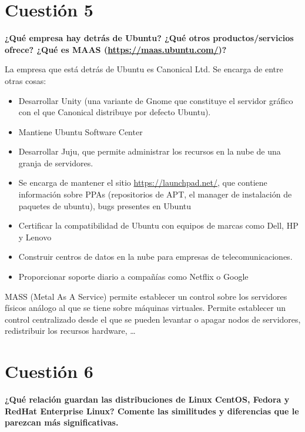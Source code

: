 \documentclass[a4paper,11pt]{article}
\newenvironment{answer}{%
\begin{list}{}{%
\addtolength{\hoffset}{0cm}
}%
\item[]}{\end{list}}
\begin{document}
\section{Cuestión 5}
\textbf{¿Qué empresa hay detrás de Ubuntu? ¿Qué otros productos/servicios ofrece? ¿Qué es MAAS 
(\url{https://maas.ubuntu.com/})?}
\begin{answer}
La empresa que está detrás de Ubuntu es Canonical Ltd.
Se encarga de entre otras cosas: \cite{canonical} \cite{wcanonical}

\begin{itemize}
 \item Desarrollar Unity (una variante de Gnome que constituye el servidor gráfico con el que Canonical
 distribuye por defecto Ubuntu).
 \item Mantiene Ubuntu Software Center
 \item Desarrollar Juju, que permite administrar los recursos en la nube de una granja de servidores.
 \item Se encarga de mantener el sitio \url{https://launchpad.net/}, que contiene información sobre
 PPAs (repositorios de APT, el manager de instalación de paquetes de ubuntu), bugs presentes en Ubuntu
 \item Certificar la compatibilidad de Ubuntu con equipos de marcas como Dell, HP y Lenovo
 \item Construir centros de datos en la nube para empresas de telecomunicaciones.
 \item Proporcionar soporte diario a compañías como Netflix o Google
\end{itemize}

 \cite{mass} MASS (Metal As A Service) permite establecer un control sobre los servidores físicos análogo al que se tiene sobre
 máquinas virtuales. Permite establecer un control centralizado desde el que se pueden levantar o apagar nodos de servidores,
 redistribuir los recursos hardware, \ldots
\end{answer}
 
\section{Cuestión 6}
\textbf{¿Qué relación guardan las distribuciones de Linux CentOS, Fedora y RedHat Enterprise Linux? Comente las 
similitudes y diferencias que le parezcan más significativas.}
\end{document}
